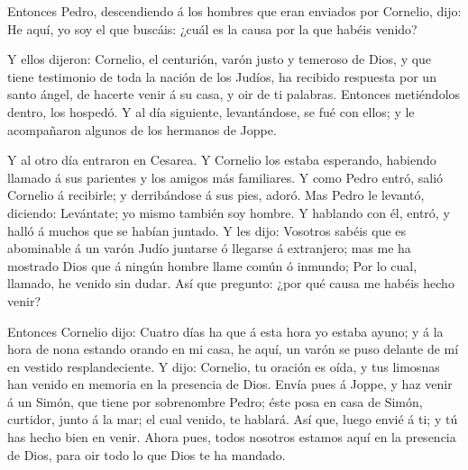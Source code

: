  Entonces Pedro, descendiendo á los hombres que eran
enviados por Cornelio, dijo: He aquí, yo soy el que buscáis: ¿cuál es la
causa por la que habéis venido?

 Y ellos dijeron: Cornelio, el centurión, varón justo y
temeroso de Dios, y que tiene testimonio de toda la nación de los
Judíos, ha recibido respuesta por un santo ángel, de hacerte venir á su
casa, y oir de ti palabras.  Entonces metiéndolos dentro,
los hospedó. Y al día siguiente, levantándose, se fué con ellos; y le
acompañaron algunos de los hermanos de Joppe.

 Y al otro día entraron en Cesarea. Y Cornelio los estaba
esperando, habiendo llamado á sus parientes y los amigos más familiares.
 Y como Pedro entró, salió Cornelio á recibirle; y
derribándose á sus pies, adoró.  Mas Pedro le levantó,
diciendo: Levántate; yo mismo también soy hombre.  Y
hablando con él, entró, y halló á muchos que se habían juntado.
 Y les dijo: Vosotros sabéis que es abominable á un varón
Judío juntarse ó llegarse á extranjero; mas me ha mostrado Dios que á
ningún hombre llame común ó inmundo;  Por lo cual, llamado,
he venido sin dudar. Así que pregunto: ¿por qué causa me habéis hecho
venir?

 Entonces Cornelio dijo: Cuatro días ha que á esta hora yo
estaba ayuno; y á la hora de nona estando orando en mi casa, he aquí, un
varón se puso delante de mí en vestido resplandeciente.  Y
dijo: Cornelio, tu oración es oída, y tus limosnas han venido en memoria
en la presencia de Dios.  Envía pues á Joppe, y haz venir á
un Simón, que tiene por sobrenombre Pedro; éste posa en casa de Simón,
curtidor, junto á la mar; el cual venido, te hablará.  Así
que, luego envié á ti; y tú has hecho bien en venir. Ahora pues, todos
nosotros estamos aquí en la presencia de Dios, para oir todo lo que Dios
te ha mandado.

